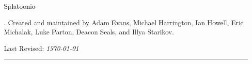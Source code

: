\begin{titlepage}

\noindent
\titlefont Splatoonio \\ \titlepagename \par
\epigraph{\titledescript. Created and maintained by Adam Evans, Michael Harrington, Ian Howell, Eric Michalak, Luke Parton, Deacon Seals, and Illya Starikov.}
{Last Revised: \textit{\today}\\\textsc{\lastEditAuthor}}
\null\vfill
\vspace*{1cm}
\noindent
\hfill
\begin{minipage}{0.35\linewidth}
    \begin{flushright}
        \printauthor
    \end{flushright}
\end{minipage}
%
\begin{minipage}{0.02\linewidth}
    \rule{1pt}{125pt}
\end{minipage}
\titlepagedecoration
\end{titlepage}
